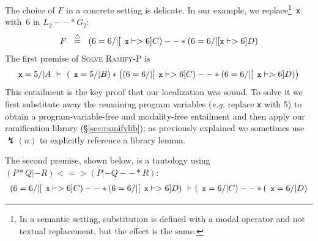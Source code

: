 \documentclass[acmsmall,screen]{acmart}  %
\newcommand{\li}[1]{{\texttt{\small #1}}} %
\newcommand{\defeq}{\mathbin{\stackrel{\triangle}{=}}} %
\newcommand{\p}[1]{\ensuremath{\mathsf{#1}}} \newcommand{\m}[1]{\ensuremath{\mathit{#1}}} \newcommand{\ma}[1]{\ensuremath{\mathcal{#1}}} \let\ramify\lightning
\newcommand{\infrulestyle}[1]{\textsc{#1}}
\newcommand{\infrule}[4]{\inferrule*[lab=\infrulestyle{#1},right=$\mathrlap{#4}$]{#2}{#3}}
\begin{document}
{The choice of $F$ in a concrete setting is delicate. In our example, we replace\footnote{In a semantic setting, substitution is defined with a modal operator and not textual replacement, but the effect is the same.}~\li{x} with~$6$ in $L_2 --* G_2$:
\[
F ~~ \defeq ~~ (6 = 6 /| [\li{x} |-> 6]C) --* (6 = 6 /| [\li{x} |-> 6]D)
\]
The first premise of \infrulestyle{Solve Ramify-P} is
\[
\begin{array} {l}
\li{x} = 5 /| A ~ |- ~ (\li{x} = 5 /| B) * \big((6 = 6 /| [\li{x} |-> 6]C) --* (6 = 6 /| [\li{x} |-> 6]D)\big)
\end{array}
\]
This entailment is the key proof that our localization was sound.  To solve it we first substitute away the remaining program variables (\emph{e.g.} replace \li{x} with 5) to obtain a program-variable-free and modality-free entailment and then apply our ramification library (\S\ref{sec:ramifylib}); as previously explained we sometimes use $\ramify(n)$ to explicitly reference a library lemma.

The second premise, shown below, is a tautology using $(P * Q |- R) <=> (P |- Q --* R)$:
\vspace*{-0.75ex}
\begin{equation}
\label{eqn:sndpremisetauto}
\begin{array}{l}
(6 = 6 /| [\li{x} |-> 6]C) --* (6 = 6 /| [\li{x} |-> 6]D) ~ |- (\li{x} = 6 /| C) --* (\li{x} = 6 /| D)
\end{array}
\vspace*{-0.75ex}
\end{equation}

}
\end{document}

